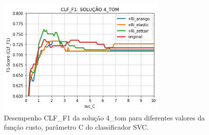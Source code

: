 \begin{figure}[h]
    \centering
    \caption{Desempenho CLF\_F1 da solução 4\_tom para diferentes valores da função custo, parâmetro C do classificador SVC.}
    \begin{center}
        \includegraphics[width=0.75\textwidth]{img/clf-f1-4-tom.png}
    \end{center}
    \vspace{-0.5cm}
    \label{fig:clf-f1-4-tom}
\end{figure}